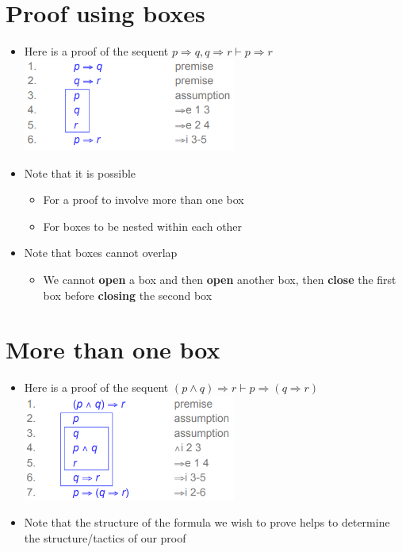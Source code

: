 \documentclass{article}[18pt]
\begin{document}
\section{Proof using boxes}
\begin{itemize}
\item Here is a proof of the sequent $p\Rightarrow q, q\Rightarrow r \vdash p \Rightarrow r$\\
\includegraphics[width=7cm]{Fig5.png}
\item Note that it is possible
\begin{itemize}
\item For a proof to involve more than one box
\item For boxes to be nested within each other
\end{itemize}
\item Note that boxes cannot overlap
\begin{itemize}
\item We cannot \textbf{open} a box and then \textbf{open} another box, then \textbf{close} the first box before \textbf{closing} the second box
\end{itemize}
\end{itemize}
\section{More than one box}
\begin{itemize}
\item Here is a proof of the sequent $(p\land q)\Rightarrow r \vdash p\Rightarrow(q\Rightarrow r)$\\
\includegraphics[width=7cm]{Fig6.png}
\item Note that the structure of the formula we wish to prove helps to determine the structure/tactics of our proof
\end{itemize}
\end{document}

